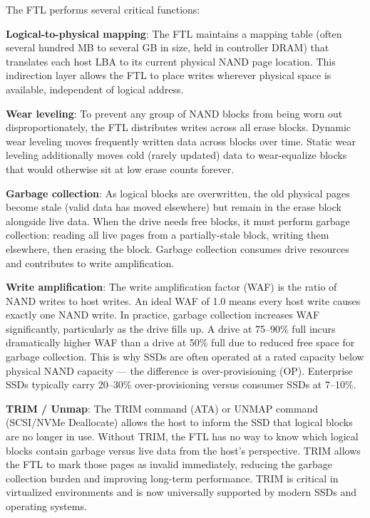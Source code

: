The FTL performs several critical functions:

\textbf{Logical-to-physical mapping}: The FTL maintains a mapping table (often several hundred MB to several GB in size, held in controller DRAM) that translates each host LBA to its current physical NAND page location. This indirection layer allows the FTL to place writes wherever physical space is available, independent of logical address.

\textbf{Wear leveling}: To prevent any group of NAND blocks from being worn out disproportionately, the FTL distributes writes across all erase blocks. Dynamic wear leveling moves frequently written data across blocks over time. Static wear leveling additionally moves cold (rarely updated) data to wear-equalize blocks that would otherwise sit at low erase counts forever.

\textbf{Garbage collection}: As logical blocks are overwritten, the old physical pages become stale (valid data has moved elsewhere) but remain in the erase block alongside live data. When the drive needs free blocks, it must perform garbage collection: reading all live pages from a partially-stale block, writing them elsewhere, then erasing the block. Garbage collection consumes drive resources and contributes to write amplification.

\textbf{Write amplification}: The write amplification factor (WAF) is the ratio of NAND writes to host writes. An ideal WAF of 1.0 means every host write causes exactly one NAND write. In practice, garbage collection increases WAF significantly, particularly as the drive fills up. A drive at 75--90\% full incurs dramatically higher WAF than a drive at 50\% full due to reduced free space for garbage collection. This is why SSDs are often operated at a rated capacity below physical NAND capacity --- the difference is over-provisioning (OP). Enterprise SSDs typically carry 20--30\% over-provisioning versus consumer SSDs at 7--10\%.

\textbf{TRIM / Unmap}: The TRIM command (ATA) or UNMAP command (SCSI/NVMe Deallocate) allows the host to inform the SSD that logical blocks are no longer in use. Without TRIM, the FTL has no way to know which logical blocks contain garbage versus live data from the host's perspective. TRIM allows the FTL to mark those pages as invalid immediately, reducing the garbage collection burden and improving long-term performance. TRIM is critical in virtualized environments and is now universally supported by modern SSDs and operating systems.

